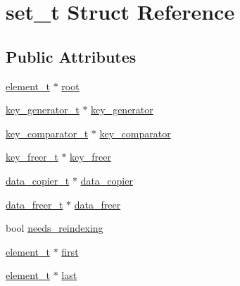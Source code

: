 \hypertarget{structset__t}{\section{set\-\_\-t Struct Reference}
\label{structset__t}
}
\subsection*{Public Attributes}
\begin{DoxyCompactItemize}
\item 
\hyperlink{structelement__t}{element\-\_\-t} $\ast$ \hyperlink{structset__t_a70f3e3d6eee37c3504a98ce79c80e9f5}{root}
\item 
\hyperlink{bst_8h_a4b88260122a8ac74596183784723c451}{key\-\_\-generator\-\_\-t} $\ast$ \hyperlink{structset__t_aa53a1cdeaee45d7d2cb5e8ac6cc99d0e}{key\-\_\-generator}
\item 
\hyperlink{bst_8h_a89b3970927114237f6996d6299633cea}{key\-\_\-comparator\-\_\-t} $\ast$ \hyperlink{structset__t_a1589eb9c56fe70bc85308a2ec215d44a}{key\-\_\-comparator}
\item 
\hyperlink{bst_8h_ad82eb5c94dd59b2e697aa733d8d3fb14}{key\-\_\-freer\-\_\-t} $\ast$ \hyperlink{structset__t_a1dd139162c66b60feb9934f8433c6057}{key\-\_\-freer}
\item 
\hyperlink{bst_8h_af84805da77fc54521fb2ef41f1293457}{data\-\_\-copier\-\_\-t} $\ast$ \hyperlink{structset__t_a24df0e4b94fc3121afc5959251ad90cf}{data\-\_\-copier}
\item 
\hyperlink{bst_8h_a7fd7f3181df3513703f3bfa1fc047bf1}{data\-\_\-freer\-\_\-t} $\ast$ \hyperlink{structset__t_ae067344927bedd2282648a3896918840}{data\-\_\-freer}
\item 
bool \hyperlink{structset__t_a65e52aeaaca08ef6ff4d036ad2f48210}{needs\-\_\-reindexing}
\item 
\hyperlink{structelement__t}{element\-\_\-t} $\ast$ \hyperlink{structset__t_a705edb15a880132b3a21c44213e237a6}{first}
\item 
\hyperlink{structelement__t}{element\-\_\-t} $\ast$ \hyperlink{structset__t_ad37f4230f327a80e6a639302954d27b4}{last}
\end{DoxyCompactItemize}


